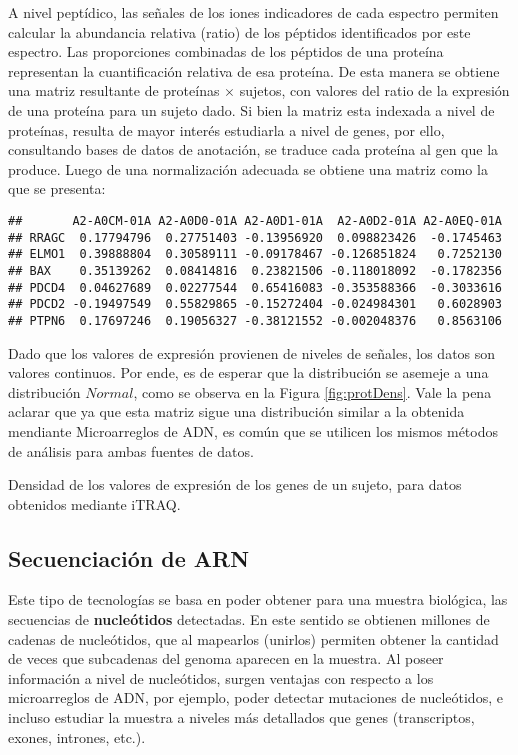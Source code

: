 \documentclass[12pt,twoside]{reedthesis}
\begin{document}
\par

A nivel peptídico, las señales de los iones indicadores de cada espectro permiten calcular la abundancia relativa (ratio) de los péptidos identificados por este espectro. Las proporciones combinadas de los péptidos de una proteína representan la cuantificación relativa de esa proteína. De esta manera se obtiene una matriz resultante de proteínas \(\times\) sujetos, con valores del ratio de la expresión de una proteína para un sujeto dado. Si bien la matriz esta indexada a nivel de proteínas, resulta de mayor interés estudiarla a nivel de genes, por ello, consultando bases de datos de anotación, se traduce cada proteína al gen que la produce. Luego de una normalización adecuada se obtiene una matriz como la que se presenta:
\begin{verbatim}
##       A2-A0CM-01A A2-A0D0-01A A2-A0D1-01A  A2-A0D2-01A A2-A0EQ-01A
## RRAGC  0.17794796  0.27751403 -0.13956920  0.098823426  -0.1745463
## ELMO1  0.39888804  0.30589111 -0.09178467 -0.126851824   0.7252130
## BAX    0.35139262  0.08414816  0.23821506 -0.118018092  -0.1782356
## PDCD4  0.04627689  0.02277544  0.65416083 -0.353588366  -0.3033616
## PDCD2 -0.19497549  0.55829865 -0.15272404 -0.024984301   0.6028903
## PTPN6  0.17697246  0.19056327 -0.38121552 -0.002048376   0.8563106
\end{verbatim}
Dado que los valores de expresión provienen de niveles de señales, los datos son valores continuos. Por ende, es de esperar que la distribución se asemeje a una distribución \(Normal\), como se observa en la Figura \ref{fig:protDens}. Vale la pena aclarar que ya que esta matriz sigue una distribución similar a la obtenida mendiante Microarreglos de ADN, es común que se utilicen los mismos métodos de análisis para ambas fuentes de datos.

Densidad de los valores de expresión de los genes de un sujeto, para datos obtenidos mediante iTRAQ.

\hypertarget{secuenciaciuxf3n-de-arn}{%
\subsection{Secuenciación de ARN}\label{secuenciaciuxf3n-de-arn}}

Este tipo de tecnologías se basa en poder obtener para una muestra biológica, las secuencias de \textbf{nucleótidos} detectadas. En este sentido se obtienen millones de cadenas de nucleótidos, que al mapearlos (unirlos) permiten obtener la cantidad de veces que subcadenas del genoma aparecen en la muestra. Al poseer información a nivel de nucleótidos, surgen ventajas con respecto a los microarreglos de ADN, por ejemplo, poder detectar mutaciones de nucleótidos, e incluso estudiar la muestra a niveles más detallados que genes (transcriptos, exones, intrones, etc.).
\end{document}
